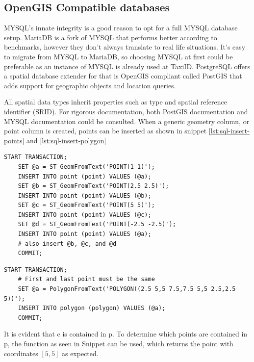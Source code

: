 \subsection{OpenGIS Compatible databases}
MYSQL’s innate integrity is a good reason to opt for a full MYSQL database setup. MariaDB is a fork of MYSQL that performs better according to benchmarks, however they don’t always translate to real life situations. It’s easy to migrate from MYSQL to MariaDB, so choosing MYSQL at first could be preferable as an instance of MYSQL is already used at TaxiID. PostgreSQL offers a spatial database extender for that is OpenGIS compliant called PostGIS that adds support for geographic objects and location queries.

All spatial data types inherit properties such as type and spatial reference identifier (SRID). For rigorous documentation, both PostGIS documentation \cite{PostGIS} and MYSQL documentation \cite{MySQL} could be consulted. When a generic geometry column, or point column is created, points can be inserted as shown in snippet \ref{lst:sql-insert-points} and \ref{lst:sql-insert-polygon}

\begin{multicols}{2}
	\begin{lstlisting}[caption={Insert four points}, label={lst:sql-insert-points}, belowskip=100pt]
	START TRANSACTION;
	SET @a = ST_GeomFromText('POINT(1 1)');
	INSERT INTO point (point) VALUES (@a);
	SET @b = ST_GeomFromText('POINT(2.5 2.5)');
	INSERT INTO point (point) VALUES (@b);
	SET @c = ST_GeomFromText('POINT(5 5)');
	INSERT INTO point (point) VALUES (@c);
	SET @d = ST_GeomFromText('POINT(-2.5 -2.5)');
	INSERT INTO point (point) VALUES (@a);
	# also insert @b, @c, and @d
	COMMIT;
\end{lstlisting}
	\begin{lstlisting}[caption={Insert polygon}, label={lst:sql-insert-polygon}, belowskip=0pt]
	START TRANSACTION;
	# First and last point must be the same
	SET @a = PolygonFromText('POLYGON((2.5 5,5 7.5,7.5 5,5 2.5,2.5 5))');
	INSERT INTO polygon (polygon) VALUES (@a);
	COMMIT;
\end{lstlisting}
\end{multicols}

It is evident that c is contained in p. To determine which points are contained in p, the function as seen in Snippet  can be used, which returns the point with coordinates $[5, 5]$ as expected.

